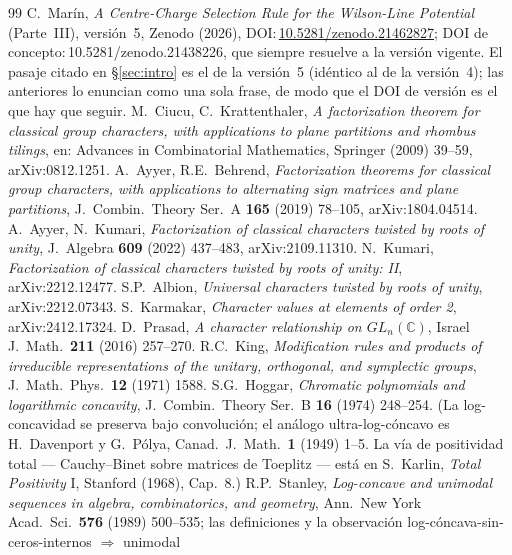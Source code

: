 \documentclass[11pt,a4paper]{article}
\begin{document}
\begin{thebibliography}{99}
 C.~Mar\'in, \emph{A Centre-Charge Selection Rule for the Wilson-Line
Potential} (Parte~III), versi\'on~5, Zenodo (2026),
DOI:\,\href{https://doi.org/10.5281/zenodo.21462827}{10.5281/zenodo.21462827}; DOI de
concepto:\,10.5281/zenodo.21438226, que siempre resuelve a la versi\'on vigente. El pasaje
citado en \S\ref{sec:intro} es el de la versi\'on~5 (id\'entico al de la versi\'on~4); las anteriores lo enuncian como una sola
frase, de modo que el DOI de versi\'on es el que hay que seguir.
 M.~Ciucu, C.~Krattenthaler, \emph{A factorization theorem for classical group
characters, with applications to plane partitions and rhombus tilings}, en: Advances in
Combinatorial Mathematics, Springer (2009) 39--59, arXiv:0812.1251.
 A.~Ayyer, R.E.~Behrend, \emph{Factorization theorems for classical group
characters, with applications to alternating sign matrices and plane partitions},
J.~Combin.\ Theory Ser.~A \textbf{165} (2019) 78--105, arXiv:1804.04514.
 A.~Ayyer, N.~Kumari, \emph{Factorization of classical characters twisted by roots
of unity}, J.~Algebra \textbf{609} (2022) 437--483, arXiv:2109.11310.
 N.~Kumari, \emph{Factorization of classical characters twisted by roots of
unity: II}, arXiv:2212.12477.
 S.P.~Albion, \emph{Universal characters twisted by roots of unity},
arXiv:2212.07343.
 S.~Karmakar, \emph{Character values at elements of order 2},
arXiv:2412.17324.
 D.~Prasad, \emph{A character relationship on $GL_n(\mathbb C)$},
Israel J.\ Math.\ \textbf{211} (2016) 257--270.
 R.C.~King, \emph{Modification rules and products of irreducible
representations of the unitary, orthogonal, and symplectic groups}, J.~Math.\ Phys.\
\textbf{12} (1971) 1588.
 S.G.~Hoggar, \emph{Chromatic polynomials and logarithmic concavity},
J.~Combin.\ Theory Ser.~B \textbf{16} (1974) 248--254. (La log-concavidad se preserva bajo
convoluci\'on; el an\'alogo ultra-log-c\'oncavo es H.~Davenport y G.~P\'olya,
Canad.\ J.~Math.\ \textbf{1} (1949) 1--5. La v\'ia de positividad total --- Cauchy--Binet sobre
matrices de Toeplitz --- est\'a en S.~Karlin, \emph{Total Positivity} I, Stanford (1968),
Cap.~8.)
 R.P.~Stanley, \emph{Log-concave and unimodal sequences in algebra,
combinatorics, and geometry}, Ann.\ New York Acad.\ Sci.\ \textbf{576} (1989) 500--535; las
definiciones y la observaci\'on log-c\'oncava-sin-ceros-internos $\Rightarrow$ unimodal

\end{thebibliography}
\end{document}
